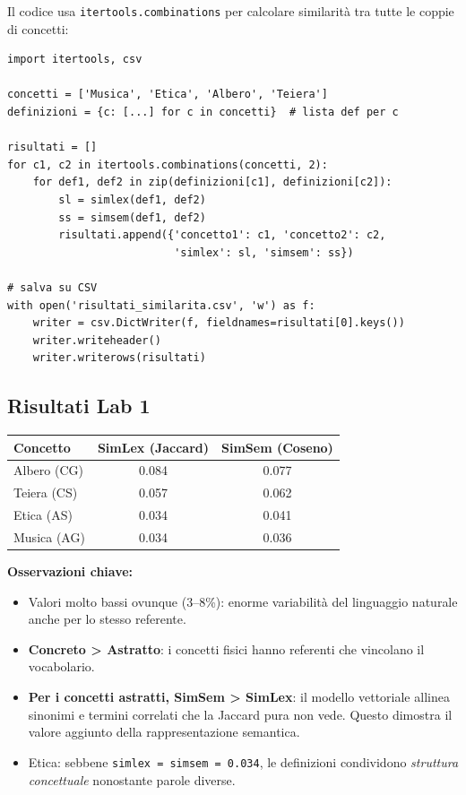 \documentclass[12pt,a4paper]{article}
\begin{document}
Il codice usa \texttt{itertools.combinations} per calcolare similarit\`a tra tutte le coppie di concetti:

\begin{codebox}
\begin{lstlisting}[style=python]
import itertools, csv

concetti = ['Musica', 'Etica', 'Albero', 'Teiera']
definizioni = {c: [...] for c in concetti}  # lista def per c

risultati = []
for c1, c2 in itertools.combinations(concetti, 2):
    for def1, def2 in zip(definizioni[c1], definizioni[c2]):
        sl = simlex(def1, def2)
        ss = simsem(def1, def2)
        risultati.append({'concetto1': c1, 'concetto2': c2,
                          'simlex': sl, 'simsem': ss})

# salva su CSV
with open('risultati_similarita.csv', 'w') as f:
    writer = csv.DictWriter(f, fieldnames=risultati[0].keys())
    writer.writeheader()
    writer.writerows(risultati)
\end{lstlisting}
\end{codebox}

\subsection{Risultati Lab 1}

\begin{resultbox}
\begin{center}
\begin{tabular}{lcc}
\toprule
\textbf{Concetto} & \textbf{SimLex (Jaccard)} & \textbf{SimSem (Coseno)} \\
\midrule
Albero (CG)  & 0.084 & 0.077 \\
Teiera (CS)  & 0.057 & 0.062 \\
Etica (AS)   & 0.034 & 0.041 \\
Musica (AG)  & 0.034 & 0.036 \\
\bottomrule
\end{tabular}
\end{center}
\end{resultbox}

\textbf{Osservazioni chiave:}
\begin{itemize}
  \item Valori molto bassi ovunque (3--8\%): enorme variabilit\`a del linguaggio naturale anche per lo stesso referente.
  \item \textbf{Concreto > Astratto}: i concetti fisici hanno referenti che vincolano il vocabolario.
  \item \textbf{Per i concetti astratti, SimSem > SimLex}: il modello vettoriale allinea sinonimi e termini correlati che la Jaccard pura non vede. Questo dimostra il valore aggiunto della rappresentazione semantica.
  \item Etica: sebbene \texttt{simlex = simsem = 0.034}, le definizioni condividono \emph{struttura concettuale} nonostante parole diverse.
\end{itemize}
\end{document}
